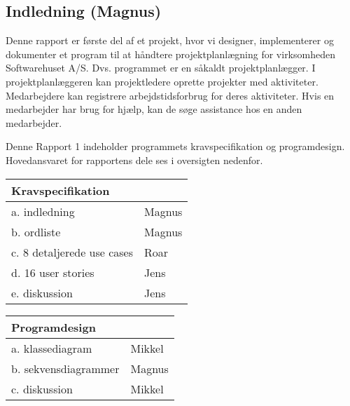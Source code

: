 
\subsection{Indledning (Magnus)}


Denne rapport er første del af et projekt, hvor vi designer, implementerer og dokumenter et program til at håndtere projektplanlægning for virksomheden Softwarehuset A/S. Dvs. programmet er en såkaldt projektplanlægger. I projektplanlæggeren kan projektledere oprette projekter med aktiviteter. Medarbejdere kan registrere arbejdstidsforbrug for deres aktiviteter. Hvis en medarbejder har brug for hjælp, kan de søge assistance hos en anden medarbejder. 

Denne Rapport 1 indeholder programmets kravspecifikation og programdesign. Hovedansvaret for rapportens dele ses i oversigten nedenfor.

\begin{multicols}{2}

\begin{table}[H]
\centering
\begin{tabular}{ll}
\textbf{Kravspecifikation} & ~ \\ \hline
a. indledning & Magnus \\ \hline
b. ordliste & Magnus \\ \hline
c. 8 detaljerede use cases & Roar \\ \hline
d. 16 user stories & Jens \\ \hline
e. diskussion & Jens
    \end{tabular}
\end{table}

\begin{table}[H]
\centering
\begin{tabular}{ll}
\textbf{Programdesign} & ~ \\ \hline
a. klassediagram & Mikkel \\ \hline
b. sekvensdiagrammer & Magnus \\ \hline
c. diskussion & Mikkel
    \end{tabular}
\end{table}

\end{multicols}

